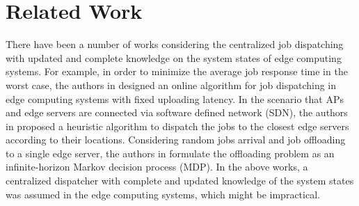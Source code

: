 \section{Related Work}
\label{sec:review}

There have been a number of works considering the centralized job dispatching with updated and complete knowledge on the system states of edge computing systems.
For example, in order to minimize the average job response time in the worst case, the authors in \cite{tan-online} designed an online algorithm for job dispatching in edge computing systems with fixed uploading latency.
In the scenario that APs and edge servers are connected via software defined network (SDN), the authors in \cite{IOTJ18-FanQ} proposed a heuristic algorithm to dispatch the jobs to the closest edge servers according to their locations.
Considering random jobs arrival and job offloading to a single edge server, the authors in \cite{mdp-globecom,mdp-tvt} formulate the offloading problem as an infinite-horizon Markov decision process (MDP).
In the above works, a centralized dispatcher with complete and updated knowledge of the system states was assumed in the edge computing systems, which might be impractical.

